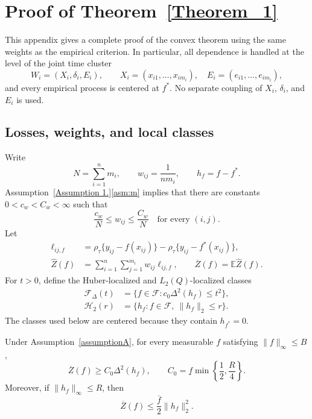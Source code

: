 \documentclass[twoside,11pt]{article}
\newenvironment{revision}{\color{revisionred}}{}
\begin{document}
\appendix
\begin{revision}

\section{Proof of Theorem~\ref{Theorem_1}}
\label{app_b}

This appendix gives a complete proof of the convex theorem using the same
weights as the empirical criterion.  In particular, all dependence is handled
at the level of the joint time cluster
\[
  W_i=(X_i,\delta_i,E_i),\qquad
  X_i=(x_{i1},\ldots,x_{im_i}),\quad
  E_i=(e_{i1},\ldots,e_{im_i}),
\]
and every empirical process is centered at $f^*$.  No separate coupling of
$X_i$, $\delta_i$, and $E_i$ is used.

\subsection{Losses, weights, and local classes}

Write
\[
  N=\sum_{i=1}^n m_i,\qquad w_{ij}=\frac{1}{nm_i},
  \qquad h_f=f-f^*.
\]
Assumption~\ref{Assumption 1.}\ref{asm:m} implies that there are constants
$0<c_w<C_w<\infty$ such that
\begin{equation}
  \frac{c_w}{N}\le w_{ij}\le \frac{C_w}{N}
  \quad\text{for every }(i,j).                                  \label{app:eq:balanced-weights}
\end{equation}
Let
\begin{align}
  \ell_{ij,f}
  &=\rho_\tau\{y_{ij}-f(x_{ij})\}
    -\rho_\tau\{y_{ij}-f^*(x_{ij})\},                           \label{app:eq:loss-diff}\\
  \widehat Z(f)&=\sum_{i=1}^n\sum_{j=1}^{m_i}w_{ij}\ell_{ij,f},
  \qquad \overline Z(f)=\mathbb E\widehat Z(f).                \label{app:eq:emp-pop-loss}
\end{align}
For $t>0$, define the Huber-localized and $L_2(Q)$-localized classes
\begin{align}
  \mathcal F_\Delta(t)
  &=\{f\in\mathcal F:c_0\Delta^2(h_f)\le t^2\},                \label{app:eq:Fdelta}\\
  \mathcal H_2(r)
  &=\{h_f:f\in\mathcal F,\ \|h_f\|_2\le r\}.                 \label{app:eq:H2}
\end{align}
The classes used below are centered because they contain $h_{f^*}=0$.

\begin{lemma}
\label{app:lem:curvature}
Under Assumption~\ref{assumptionA}, for every measurable $f$ satisfying
$\|f\|_\infty\le B$,
\begin{equation}
  \overline Z(f)\ge C_0\Delta^2(h_f),\qquad
  C_0=\underline f\min\left\{\frac12,\frac R4\right\}.          \label{app:eq:curvature}
\end{equation}
Moreover, if $\|h_f\|_\infty\le R$, then
\begin{equation}
  \overline Z(f)\le \frac{\overline f}{2}\|h_f\|_2^2.         \label{app:eq:upper-curvature}
\end{equation}
\end{lemma}


\end{revision}
\end{document}
